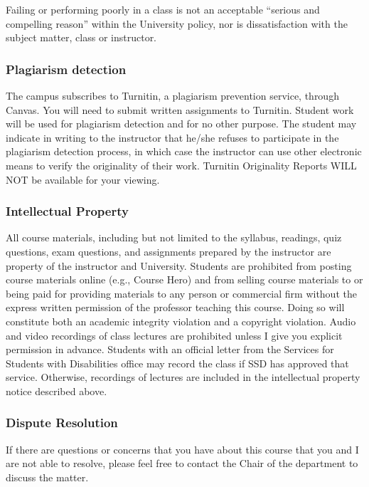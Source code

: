 Failing or performing poorly in a class is not an acceptable ``serious
and compelling reason'' within the University policy, nor is
dissatisfaction with the subject matter, class or instructor.

\subsubsection{Plagiarism detection}\label{plagiarism-detection}

The campus subscribes to Turnitin, a plagiarism prevention service,
through Canvas. You will need to submit written assignments to Turnitin.
Student work will be used for plagiarism detection and for no other
purpose. The student may indicate in writing to the instructor that
he/she refuses to participate in the plagiarism detection process, in
which case the instructor can use other electronic means to verify the
originality of their work. Turnitin Originality Reports WILL NOT be
available for your viewing.

\subsubsection{Intellectual Property}\label{intellectual-property}

All course materials, including but not limited to the syllabus,
readings, quiz questions, exam questions, and assignments prepared by
the instructor are property of the instructor and University. Students
are prohibited from posting course materials online (e.g., Course Hero)
and from selling course materials to or being paid for providing
materials to any person or commercial firm without the express written
permission of the professor teaching this course. Doing so will
constitute both an academic integrity violation and a copyright
violation. Audio and video recordings of class lectures are prohibited
unless I give you explicit permission in advance. Students with an
official letter from the Services for Students with Disabilities office
may record the class if SSD has approved that service. Otherwise,
recordings of lectures are included in the intellectual property notice
described above.

\subsubsection{Dispute Resolution}\label{dispute-resolution}

If there are questions or concerns that you have about this course that
you and I are not able to resolve, please feel free to contact the Chair
of the department to discuss the matter.

